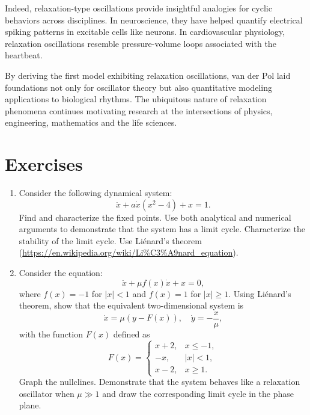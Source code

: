 Indeed, relaxation-type oscillations provide insightful analogies for cyclic behaviors across disciplines. In neuroscience, they have helped quantify electrical spiking patterns in excitable cells like neurons. In cardiovascular physiology, relaxation oscillations resemble pressure-volume loops associated with the heartbeat.

By deriving the first model exhibiting relaxation oscillations, van der Pol laid foundations not only for oscillator theory but also quantitative modeling applications to biological rhythms. The ubiquitous nature of relaxation phenomena continues motivating research at the intersections of physics, engineering, mathematics and the life sciences.

\section{Exercises}

\begin{enumerate}
    \item Consider the following dynamical system: $$\ddot{x} + a \dot{x}(x^2 - 4) + x = 1.$$ Find and characterize the fixed points. Use both analytical and numerical arguments to demonstrate that the system has a limit cycle. Characterize the stability of the limit cycle. Use Liénard's theorem (\url{https://en.wikipedia.org/wiki/Li%C3%A9nard_equation}).
  
    \item Consider the equation: 
    \begin{equation*}
        \ddot{x} + \mu f(x) \dot{x} + x = 0,
    \end{equation*}
    where $f(x) = -1$ for $|x| < 1$ and $f(x) = 1$ for $|x| \geq 1$. Using Liénard's theorem, show that the equivalent two-dimensional system is 
    \begin{equation*}
        \dot{x} = \mu(y - F(x)), \quad \dot{y} = -\frac{x}{\mu},
    \end{equation*}
    with the function $F(x)$ defined as 
    \begin{equation*}
        F(x) = \begin{cases} 
        x + 2, & x \leq -1, \\ 
        -x, & |x| < 1, \\ 
        x - 2, & x \geq 1.
     \end{cases}
    \end{equation*}
    Graph the nullclines. Demonstrate that the system behaves like a relaxation oscillator when $\mu \gg 1$ and draw the corresponding limit cycle in the phase plane.
  
 \end{enumerate}
  